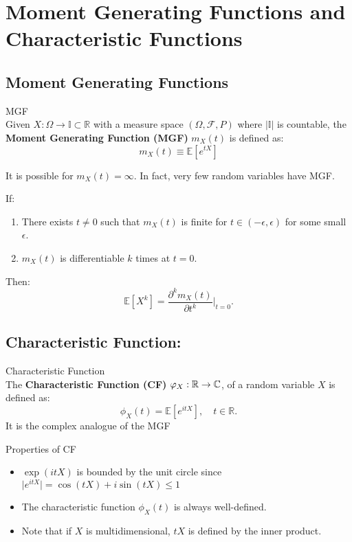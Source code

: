 \newpage

\newpage
\section{Moment Generating Functions and Characteristic Functions}

\subsection{Moment Generating Functions}

\begin{df}{MGF}\\
Given $X: \Omega \to \mathbb{I} \subset \mathbb{R}$ with a measure space $(\Omega, \mathscr{F}, P)$ where $|\mathbb{I}|$ is countable, the \textbf{Moment Generating Function (MGF)} $m_X(t)$ is defined as:
$$m_X(t) \equiv \mathbb{E}[e^{tX}]$$
\end{df}

\begin{rmk}{}
It is possible for $m_X(t) = \infty$. In fact, very few random variables have MGF. 
\end{rmk}

\begin{rmk}{}
If:
\begin{enumerate}
    \item There exists $t \neq 0$ such that $m_X(t)$ is finite for $t \in (-\epsilon, \epsilon)$ for some small $\epsilon$.
    \item $m_X(t)$ is differentiable $k$ times at $t = 0$.
\end{enumerate}
Then:
\[
\mathbb{E}[X^k] = \frac{\partial^k m_X(t)}{\partial t^k} \bigg|_{t=0}.
\]
\end{rmk}


\subsection{Characteristic Function:}

\begin{df}{Characteristic Function}\\
The \textbf{Characteristic Function (CF)} $\varphi_X: {\mathbb{R}}\rightarrow \mathbb{C}$, of a random variable $X$ is defined as:
\[
\phi_X(t) = \mathbb{E}[e^{itX}], \quad t \in \mathbb{R}.
\]
It is the complex analogue of the MGF
\end{df}
\begin{prop}{Properties of CF}
\begin{itemize}
    \item $\exp(itX)$ is bounded by the unit circle since $\lvert e^{itX} \rvert = \cos(tX) + i\sin(tX) \leq 1$ 
    \item The characteristic function $\phi_X(t)$ is always well-defined.
    \item Note that if $X$ is multidimensional, $tX$ is defined by the inner product.
\end{itemize}	
\end{prop}

